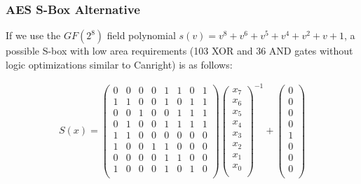\documentclass[10pt]{beamer}
\begin{document}
\begin{frame}
	\frametitle{AES S-Box Alternative}
	If we use the $GF(2^8)$ field polynomial $s(v) = v^8 + v^6 + v^5 + v^4 + v^2 + v + 1$, a possible S-box with low area requirements (103 XOR and 36 AND gates without logic optimizations similar to Canright) is as follows:

\begin{align*}
S(x) =  
\begin{pmatrix}
0 & 0 & 0 & 0 & 1 & 1 & 0 & 1 \\
1 & 1 & 0 & 0 & 1 & 0 & 1 & 1 \\
0 & 0 & 1 & 0 & 0 & 1 & 1 & 1 \\
0 & 1 & 0 & 0 & 1 & 1 & 1 & 1 \\
1 & 1 & 0 & 0 & 0 & 0 & 0 & 0 \\
1 & 0 & 0 & 1 & 1 & 0 & 0 & 0 \\
0 & 0 & 0 & 0 & 1 & 1 & 0 & 0 \\
1 & 0 & 0 & 0 & 1 & 0 & 1 & 0 \\
\end{pmatrix}
\begin{pmatrix}
x_7 \\
x_6 \\
x_5 \\
x_4 \\
x_3 \\ 
x_2 \\
x_1 \\
x_0 \\
\end{pmatrix}^{-1}
+
\begin{pmatrix}
0 \\
0 \\
0 \\
0 \\
1 \\ 
0 \\
0 \\
0 \\
\end{pmatrix}
\end{align*}
\end{frame}
\end{document}
